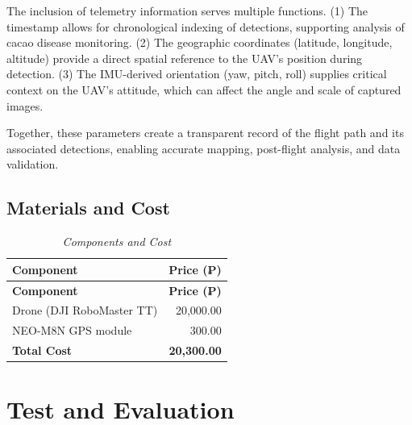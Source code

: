The inclusion of telemetry information serves multiple functions.
(1) The timestamp allows for chronological indexing of detections, supporting analysis of cacao disease monitoring.
(2) The geographic coordinates (latitude, longitude, altitude) provide a direct spatial reference to the UAV’s position during detection.
(3) The IMU-derived orientation (yaw, pitch, roll) supplies critical context on the UAV’s attitude, which can affect the angle and scale of captured images.

Together, these parameters create a transparent record of the flight path and its associated detections, enabling accurate mapping, post-flight analysis, and data validation.

\subsection{Materials and Cost}

\begin{longtable}{p{8cm} r}
	\caption{\textit{Components and Cost}} \label{tab:components} \\

	\toprule
	\textbf{Component}        & \textbf{Price (₱)}                \\
	\midrule
	\endfirsthead

	\toprule
	\textbf{Component}        & \textbf{Price (₱)}                \\
	\midrule
	\endhead

	\bottomrule
	\endfoot

	Drone (DJI RoboMaster TT) & 20,000.00                         \\
	NEO-M8N GPS module        & 300.00                            \\
	\midrule
	\textbf{Total Cost}       & \textbf{20,300.00}                \\
\end{longtable}


\section{Test and Evaluation}

